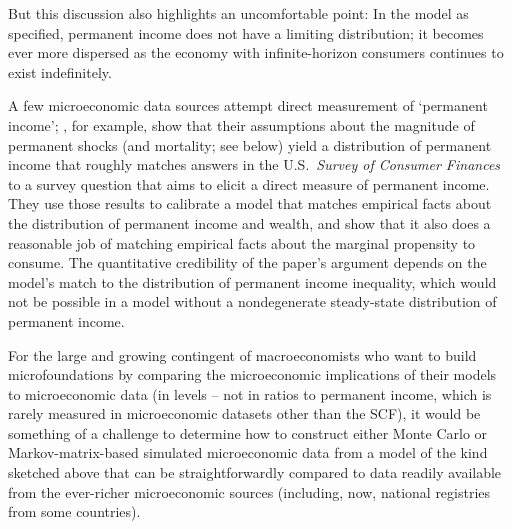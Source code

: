 \documentclass[BufferStockTheory]{subfiles}
\begin{document}

But this discussion also highlights an uncomfortable point: In the model as specified, permanent income does not have a limiting distribution; it becomes ever more dispersed as the economy with infinite-horizon consumers continues to exist indefinitely.

\begin{comment}
  The problem is not with the growth factor $\PGro$; the same point would hold with $\PGro=1$, in which case the proposition would become
  \begin{align}
    \cv(\cRat_{t+1},\pLevBF_{t+1})   & = \cv(\cRat_{t},\pLevBF_{t}) \label{eq:covSolnStable} .
  \end{align}
\end{comment}

A few microeconomic data sources attempt direct measurement of `permanent income'; \cite{cstwMPC}, for example, show that their assumptions about the magnitude of permanent shocks (and mortality; see below) yield a distribution of permanent income that roughly matches answers in the U.S.\ \emph{Survey of Consumer Finances} to a survey question that aims to elicit a direct measure of permanent income.  They use those results to calibrate a model that matches empirical facts about the distribution of permanent income and wealth, and show that it also does a reasonable job of matching empirical facts about the marginal propensity to consume.  The quantitative credibility of the paper's argument depends on the model's match to the distribution of permanent income inequality, which would not be possible in a model without a nondegenerate steady-state distribution of permanent income.

For the large and growing contingent of macroeconomists who want to build microfoundations by comparing the microeconomic implications of their models to microeconomic data (in levels -- not in ratios to permanent income, which is rarely measured in microeconomic datasets other than the SCF), it would be something of a challenge to determine how to construct either Monte Carlo or Markov-matrix-based simulated microeconomic data from a model of the kind sketched above that can be straightforwardly compared to data readily available from the ever-richer microeconomic sources (including, now, national registries from some countries).  %
\end{document}
